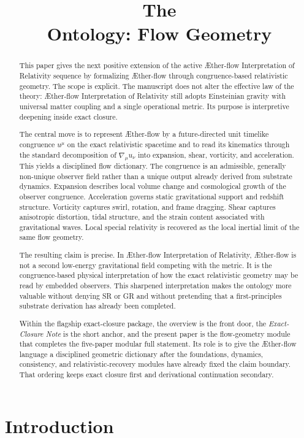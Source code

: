 \documentclass[11pt]{article}
\title{The \TheoryName{}\\[0.4em]
Ontology: Flow Geometry}
\author{}
\date{}
\newcommand{\Aflow}{\AE{}ther-flow}
\newcommand{\TheoryName}{\Aflow{} Interpretation of Relativity}
\begin{document}
\AetherFlowAPATitlePage

\begin{abstract}
This paper gives the next positive extension of the active \TheoryName{} sequence by formalizing \Aflow{} through congruence-based relativistic geometry. The scope is explicit. The manuscript does not alter the effective law of the theory: \TheoryName{} still adopts Einsteinian gravity with universal matter coupling and a single operational metric. Its purpose is interpretive deepening inside exact closure.

The central move is to represent \Aflow{} by a future-directed unit timelike congruence \(u^\mu\) on the exact relativistic spacetime and to read its kinematics through the standard decomposition of \(\nabla_\mu u_\nu\) into expansion, shear, vorticity, and acceleration. This yields a disciplined flow dictionary. The congruence is an admissible, generally non-unique observer field rather than a unique output already derived from substrate dynamics. Expansion describes local volume change and cosmological growth of the observer congruence. Acceleration governs static gravitational support and redshift structure. Vorticity captures swirl, rotation, and frame dragging. Shear captures anisotropic distortion, tidal structure, and the strain content associated with gravitational waves. Local special relativity is recovered as the local inertial limit of the same flow geometry.

The resulting claim is precise. In \TheoryName{}, \Aflow{} is not a second low-energy gravitational field competing with the metric. It is the congruence-based physical interpretation of how the exact relativistic geometry may be read by embedded observers. This sharpened interpretation makes the ontology more valuable without denying SR or GR and without pretending that a first-principles substrate derivation has already been completed.

Within the flagship exact-closure package, the overview is the front door, the \emph{Exact-Closure Note} is the short anchor, and the present paper is the flow-geometry module that completes the five-paper modular full statement. Its role is to give the \Aflow{} language a disciplined geometric dictionary after the foundations, dynamics, consistency, and relativistic-recovery modules have already fixed the claim boundary. That ordering keeps exact closure first and derivational continuation secondary.
\end{abstract}

\section{Introduction}
\end{document}
